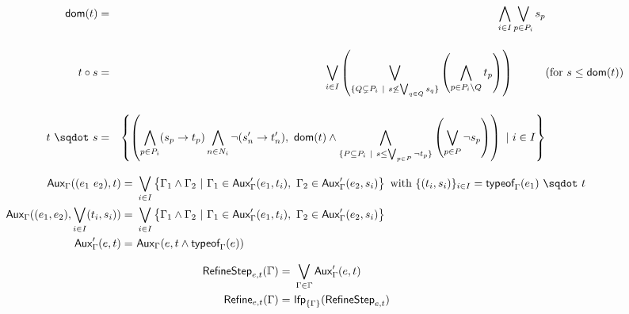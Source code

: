 \documentclass[a4paper]{article}%
\begin{document}
    \begin{eqnarray*}
        \dom{t}    & = & \bigwedge_{i\in I}\bigvee_{p\in P_i}s_p\\[4mm]
        \apply t s & = & \bigvee_{i\in I}\left(\bigvee_{\{Q\subsetneq P_i\alt s\not\leq\bigvee_{q\in Q}s_q\}}\left(\bigwedge_{p\in P_i\setminus Q}t_p\right)\right)\hspace*{1cm}\makebox[0cm][l]{(for $s\leq\dom{t}$)}\\[4mm]
        \worra t s & = & \left\{\left(\bigwedge_{p\in P_i}(s_p\to t_p)\bigwedge_{n\in N_i}\neg(s_n'\to t_n'),\ \dom t \wedge\bigwedge_{\{P \subseteq P_i\alt s \leq \bigvee_{p \in P} \neg t_p\}} \left(\bigvee_{p \in P} \neg s_p \right)\right)\ |\ i\in I\right\}
    \end{eqnarray*}

    \begin{align*}
        \Raux{\Gamma}((e_1\ e_2),t) =&\ \bigvee_{i\in I}\left\{\Gamma_1\land\Gamma_2\ |\ \Gamma_1\in\Raux{\Gamma}'(e_1,t_i),\ \Gamma_2\in\Raux{\Gamma}'(e_2,s_i)\right\}\text{ with } \{(t_i, s_i)\}_{i\in I}=\worra{\tyof{e_1}\Gamma}{t}\\
        \Raux{\Gamma}((e_1,e_2),\bigvee_{i\in I}(t_i,s_i)) =&\ \bigvee_{i\in I}\left\{\Gamma_1\land\Gamma_2\ |\ \Gamma_1\in\Raux{\Gamma}'(e_1,t_i),\ \Gamma_2\in\Raux{\Gamma}'(e_2,s_i)\right\}\\
        \Raux{\Gamma}'(e,t) =&\ \Raux{\Gamma}(e, t\land\tyof{e}\Gamma)
    \end{align*}

    \begin{align*}
        \RefineStep{e,t}(\bbGamma) =&\ \bigvee_{\Gamma\in\bbGamma}{\Raux{\Gamma}'(e,t)}\\
        \Refine{e,t}(\Gamma) =&\ \lfp{\{\Gamma\}}(\RefineStep{e,t})
    \end{align*}
\end{document}
